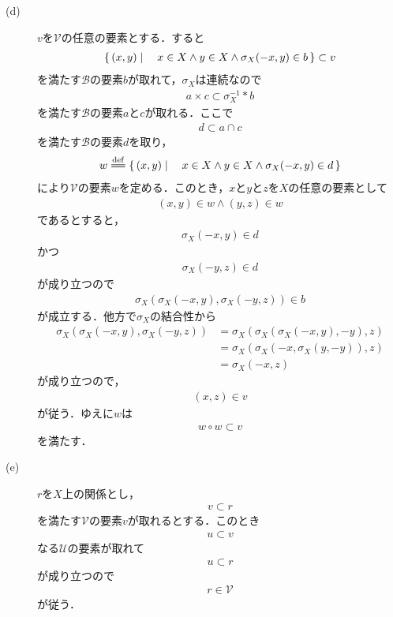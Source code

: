 \begin{description}
		\item[(d)] $v$を$\mathscr{V}$の任意の要素とする．すると
			\begin{align}
				\left\{\, (x,y) \mid \quad x \in X \wedge y \in X \wedge \sigma_X(-x,y) \in b\, \right\} \subset v
			\end{align}
			を満たす$\mathscr{B}$の要素$b$が取れて，$\sigma_X$は連続なので
			\begin{align}
				a \times c \subset \sigma_X^{-1} \ast b
			\end{align}
			を満たす$\mathscr{B}$の要素$a$と$c$が取れる．ここで
			\begin{align}
				d \subset a \cap c
			\end{align}
			を満たす$\mathscr{B}$の要素$d$を取り，
			\begin{align}
				w \defeq \Set{(x,y)}{x \in X \wedge y \in X \wedge \sigma_X(-x,y) \in d}
			\end{align}
			により$\mathscr{V}$の要素$w$を定める．このとき，$x$と$y$と$z$を$X$の任意の要素として
			\begin{align}
				(x,y) \in w \wedge (y,z) \in w
			\end{align}
			であるとすると，
			\begin{align}
				\sigma_X(-x,y) \in d
			\end{align}
			かつ
			\begin{align}
				\sigma_X(-y,z) \in d
			\end{align}
			が成り立つので
			\begin{align}
				\sigma_X\left(\sigma_X(-x,y),\sigma_X(-y,z)\right) \in b
			\end{align}
			が成立する．他方で$\sigma_X$の結合性から
			\begin{align}
				\sigma_X\left(\sigma_X(-x,y),\sigma_X(-y,z)\right)
				&= \sigma_X\left(\sigma_X\left(\sigma_X(-x,y),-y\right),z\right) \\
				&= \sigma_X\left(\sigma_X\left(-x,\sigma_X(y,-y)\right),z\right) \\
				&= \sigma_X(-x,z)
			\end{align}
			が成り立つので，
			\begin{align}
				(x,z) \in v
			\end{align}
			が従う．ゆえに$w$は
			\begin{align}
				w \circ w \subset v
			\end{align}
			を満たす．
			
		\item[(e)] $r$を$X$上の関係とし，
			\begin{align}
				v \subset r
			\end{align}
			を満たす$\mathscr{V}$の要素$v$が取れるとする．このとき
			\begin{align}
				u \subset v
			\end{align}
			なる$\mathscr{U}$の要素が取れて
			\begin{align}
				u \subset r
			\end{align}
			が成り立つので
			\begin{align}
				r \in \mathscr{V}
			\end{align}
			が従う．
			\QED
	\end{description}
